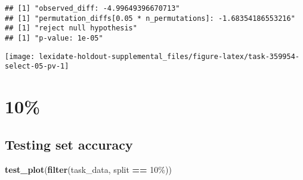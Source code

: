 \documentclass[
]{book}
\newenvironment{Shaded}{\begin{snugshade}}{\end{snugshade}}
\newcommand{\AttributeTok}[1]{\textcolor[rgb]{0.13,0.29,0.53}{#1}}
\newcommand{\DecValTok}[1]{\textcolor[rgb]{0.00,0.00,0.81}{#1}}
\newcommand{\FunctionTok}[1]{\textcolor[rgb]{0.13,0.29,0.53}{\textbf{#1}}}
\newcommand{\NormalTok}[1]{#1}
\newcommand{\OtherTok}[1]{\textcolor[rgb]{0.56,0.35,0.01}{#1}}
\newcommand{\SpecialCharTok}[1]{\textcolor[rgb]{0.81,0.36,0.00}{\textbf{#1}}}
\newcommand{\StringTok}[1]{\textcolor[rgb]{0.31,0.60,0.02}{#1}}
\begin{document}
\begin{Shaded}
\end{Shaded}

\begin{verbatim}
## [1] "observed_diff: -4.99649396670713"
## [1] "permutation_diffs[0.05 * n_permutations]: -1.68354186553216"
## [1] "reject null hypothesis"
## [1] "p-value: 1e-05"
\end{verbatim}

\texttt{[image: lexidate-holdout-supplemental\_files/figure-latex/task-359954-select-05-pv-1]}

\hypertarget{section-6}{%
\section{10\%}\label{section-6}}

\hypertarget{testing-set-accuracy-6}{%
\subsection{Testing set accuracy}\label{testing-set-accuracy-6}}

\begin{Shaded}
\begin{Highlighting}[]
\FunctionTok{test\_plot}\NormalTok{(}\FunctionTok{filter}\NormalTok{(task\_data, split }\SpecialCharTok{==} \StringTok{\textquotesingle{}10\%\textquotesingle{}}\NormalTok{))}
\end{Highlighting}
\end{Shaded}
\end{document}
